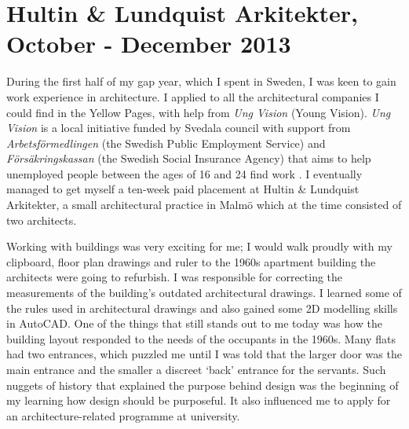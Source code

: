 


\section{Hultin \& Lundquist Arkitekter, October - December 2013}


During the first half of my gap year, which I spent in Sweden, I was keen to gain work experience in architecture. I applied to all the architectural companies I could find in the Yellow Pages, with help from \textit{Ung Vision} (Young Vision).
\textit{Ung Vision} is a local initiative funded by Svedala council
with support from \textit{Arbetsf\"ormedlingen} (the Swedish Public Employment Service)
and \textit{F\"orsäkringskassan} (the Swedish Social Insurance Agency)
that aims to help unemployed people between the ages of 16 and 24 find work \citep{ungvision:online}.
I eventually managed to get myself a ten-week paid placement at Hultin \& Lundquist Arkitekter, a small architectural practice in Malm\"o which at the time consisted of two architects.

Working with buildings was very exciting for me; I would walk proudly with my clipboard, floor plan drawings and ruler to the 1960s apartment building the architects were going to refurbish.
I was responsible for correcting the measurements of the building's outdated architectural drawings.
I learned some of the rules used in architectural drawings and also gained some 2D modelling skills in  AutoCAD.
One of the things that still stands out to me today was how the building layout responded to the needs of the occupants in the 1960s.
Many flats had two entrances, which puzzled me until I was told that the larger door was the main entrance and the smaller a discreet `back' entrance for the servants.
Such nuggets of history that explained the purpose behind design was the beginning of my learning how design should be purposeful.
It also influenced me to apply for an architecture-related programme at university.